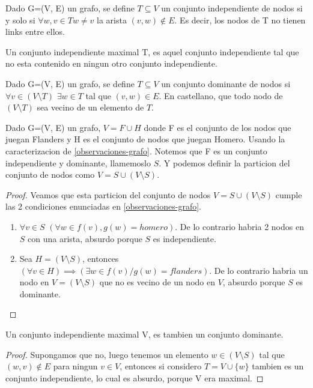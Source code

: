 \begin{definition}
	Dado G=(V, E) un grafo, se define $T \subseteq V$ un conjunto independiente de nodos si y solo si $\forall w,v \in T w \neq v$ la arista $(v, w) \notin E$. Es decir, los nodos de T no tienen links entre ellos.
\end{definition}

\begin{definition}
	Un conjunto independiente maximal T, es aquel conjunto independiente tal que no esta contenido en ningun otro conjunto independiente.
\end{definition}

\begin{definition}
	Dado G=(V, E) un grafo, se define $T \subseteq V$ un conjunto dominante de nodos si $\forall v \in (V \setminus T) $ $\exists w \in T $ tal que $ (v, w) \in E$. En castellano, que todo nodo de $(V \setminus T) $ sea vecino de un elemento de $T$.
\end{definition}

\begin{theorem}
	Dado G=(V, E) un grafo, $V = F \cup H$ donde F es el conjunto de los nodos que juegan Flanders y H es el conjunto de nodos que juegan Homero. Usando la caracterizacion de \ref{observaciones-grafo}. Notemos que F es un conjunto independiente y dominante, llamemoslo $S$. Y podemos definir la particion del conjunto de nodos como $V = S \cup (V \setminus S)$.
\end{theorem}
\begin{proof}
	Veamos que esta particion del conjunto de nodos $V = S \cup (V \setminus S)$ cumple las 2 condiciones enunciadas en \ref{observaciones-grafo}.
	\begin{enumerate}
		\item $\forall v \in S $ $(\forall w \in f(v), g(w) = homero) $. De lo contrario habria 2 nodos en $S$ con una arista, absurdo porque $S$ es independiente.
		\item Sea $H = (V \setminus S)$, entonces $(\forall v \in H) \implies (\exists w \in f(v)/ g(w) = flanders)$. De lo contrario habria un nodo en $V = (V \setminus S)$ que no es vecino de un nodo en $V$, absurdo porque $S$ es dominante.
	\end{enumerate}
\end{proof}

\begin{theorem}
	Un conjunto independiente maximal V, es tambien un conjunto dominante.
\end{theorem}
\begin{proof}
	Supongamos que no, luego tenemos un elemento $w \in (V \setminus S)$ tal que $(w, v) \notin E$ para ningun $v \in V$, entonces si considero $T = V \cup \{w\}$ tambien es un conjunto independiente, lo cual es absurdo, porque V era maximal.
\end{proof}

